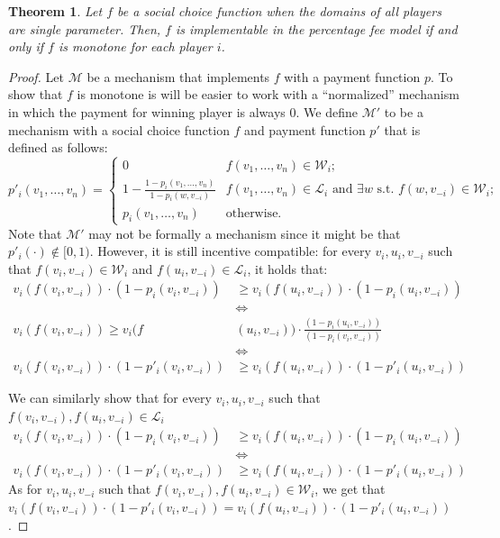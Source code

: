 \documentclass{article}
\newtheorem{theorem}{Theorem}\newtheorem{lemma}[theorem]{Lemma}\newtheorem{proposition}[theorem]{Proposition}\newtheorem{corollary}[theorem]{Corollary}\newtheorem{definition}[theorem]{Definition}\newtheorem{claim}[theorem]{Claim}\newtheorem*{claim*}{Claim}\newenvironment{subproof}{\begin{proof}[Proof of claim]}{\end{proof}}
\newcommand{\cM}{{\mathcal M}}
\begin{document}
\begin{theorem}
Let $f$ be a social choice function when the domains of all players are single parameter. Then, $f$ is implementable in the percentage fee model if and only if $f$ is monotone for each player $i$.
\end{theorem}
\begin{proof}
Let $\cM$ be a mechanism that implements $f$ with a payment function $p$. To show that $f$ is monotone is will be easier to work with a ``normalized'' mechanism in which the payment for winning player is always $0$. We define  $\cM'$ to be a mechanism with a social choice function $f$ and payment function $p'$ that is defined as follows:
$$
p'_i(v_1,\ldots, v_n)=
\begin{cases}
0 & f(v_1,\ldots, v_n)\in \mathcal W_i;\\
1-\frac {1-p_i(v_1,\ldots, v_n)} {1-p_i(w,v_{-i})} & f(v_1,\ldots, v_n)\in \mathcal L_i \text{ and $\exists w$ s.t. $f(w,v_{-i})\in \mathcal W_i$;}\\
p_i(v_1,\ldots, v_n) & \text{otherwise.}
\end{cases}
$$
Note that $\cM'$ may not be formally a mechanism since it might be that $p'_i(\cdot) \not\in [0,1)$. However, it is still incentive compatible: for every $v_i,u_i,v_{-i}$ such that $f(v_i,v_{-i}) \in \mathcal W_i$ and  $f(u_i,v_{-i}) \in \mathcal L_i$, it holds that:
\begin{align*}
	v_i(f(v_i,v_{-i}))\cdot (1-p_i(v_i,v_{-i})) &\geq v_i(f(u_i,v_{-i}))\cdot (1-p_i(u_i,v_{-i})) \\
	&\iff& \\
	v_i(f(v_i,v_{-i})) \geq v_i(f&(u_i,v_{-i}))\cdot \frac {(1-p_i(u_i,v_{-i}))} {(1-p_i(v_i,v_{-i}))} \\
	& \iff \\
	 v_i(f(v_i,v_{-i}))\cdot (1-p'_i(v_i,v_{-i})) &\geq v_i(f(u_i,v_{-i}))\cdot (1-p'_i(u_i,v_{-i}))
\end{align*}


  We can similarly show that for every $v_i,u_i,v_{-i}$ such that $f(v_i,v_{-i}) ,f(u_i,v_{-i}) \in \mathcal L_i$
\begin{align*}
v_i(f(v_i,v_{-i}))\cdot (1-p_i(v_i,v_{-i})) &\geq v_i(f(u_i,v_{-i}))\cdot (1-p_i(u_i,v_{-i})) 
\\ &\iff 
\\ v_i(f(v_i,v_{-i}))\cdot (1-p'_i(v_i,v_{-i})) &\geq v_i(f(u_i,v_{-i}))\cdot (1-p'_i(u_i,v_{-i}))
\end{align*}
As for $v_i,u_i,v_{-i}$ such that $f(v_i,v_{-i}) ,f(u_i,v_{-i}) \in \mathcal W_i$, we get that $v_i(f(v_i,v_{-i}))\cdot (1-p'_i(v_i,v_{-i})) = v_i(f(u_i,v_{-i}))\cdot (1-p'_i(u_i,v_{-i}))$.


\end{proof}
\end{document}
